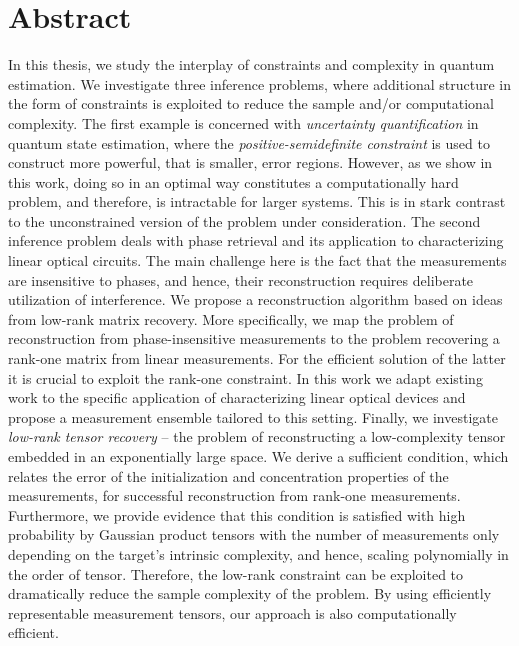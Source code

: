 \documentclass[
  a4paper,
  11pt,
  BCOR=8mm,
  twoside,
  headsepline]{scrbook}
\begin{document}
\chapter*{Abstract}

In this thesis, we study the interplay of constraints and complexity in quantum estimation.
We investigate three inference problems, where additional structure in the form of constraints is exploited to reduce the sample and/or computational complexity.
The first example is concerned with \emph{uncertainty quantification} in quantum state estimation, where the \emph{positive-semidefinite constraint} is used to construct more powerful, that is smaller, error regions.
However, as we show in this work, doing so in an optimal way constitutes a computationally hard problem, and therefore, is intractable for larger systems.
This is in stark contrast to the unconstrained version of the problem under consideration.
The second inference problem deals with phase retrieval and its application to characterizing linear optical circuits.
The main challenge here is the fact that the measurements are insensitive to phases, and hence, their reconstruction requires deliberate utilization of interference.
We propose a reconstruction algorithm based on ideas from low-rank matrix recovery.
More specifically, we map the problem of reconstruction from phase-insensitive measurements to the problem recovering a rank-one matrix from linear measurements.
For the efficient solution of the latter it is crucial to exploit the rank-one constraint.
In this work we adapt existing work to the specific application of characterizing linear optical devices and propose a measurement ensemble tailored to this setting.
Finally, we investigate \emph{low-rank tensor recovery} -- the problem of reconstructing a low-complexity tensor embedded in an exponentially large space.
We derive a sufficient condition, which relates the error of the initialization and concentration properties of the measurements, for successful reconstruction from rank-one measurements.
Furthermore, we provide evidence that this condition is satisfied with high probability by Gaussian product tensors with the number of measurements only depending on the target's intrinsic complexity, and hence, scaling polynomially in the order of tensor.
Therefore, the low-rank constraint can be exploited to dramatically reduce the sample complexity of the problem.
By using efficiently representable measurement tensors, our approach is also computationally efficient.

\end{document}
